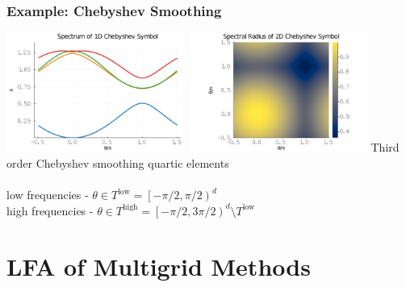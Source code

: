 \documentclass{beamer}
\begin{document}
\begin{frame}
\begin{center}
\frametitle{Example: Chebyshev Smoothing}

\includegraphics[height=3.9cm]{../img/ChebyshevSymbol1D}
\includegraphics[height=3.9cm]{../img/ChebyshevSymbol2D}
{\small Third order Chebyshev smoothing quartic elements}\\

~\\

low frequencies - $\theta \in T^{\text{low}} = \left[ - \pi / 2, \pi / 2 \right)^d$\\

high frequencies - $\theta \in T^{\text{high}} = \left[ - \pi / 2, 3 \pi / 2 \right)^d \setminus T^{\text{low}}$

\end{center}
\end{frame}

\section{LFA of Multigrid Methods}
\end{document}
